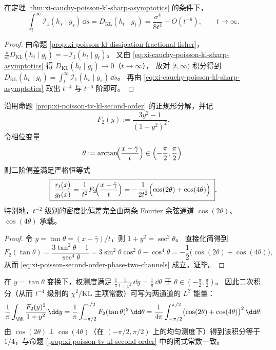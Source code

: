 \begin{corollary}\label{cor:xi-cauchy-poisson-fisher-tail-integral}
在定理 \ref{thm:xi-cauchy-poisson-kl-sharp-asymptotics} 的条件下，
\[
\int_t^\infty \mathcal I_1(h_s\mid g_s)\,\dd s
=D_{\mathrm{KL}}(h_t\mid g_t)
=\frac{\sigma^4}{8t^4}+O(t^{-6}),
\qquad t\to\infty.
\]
\end{corollary}
\begin{proof}
由命题 \ref{prop:xi-poisson-kl-dissipation-fractional-fisher}，
\(
\frac{\dd}{\dd t}D_{\mathrm{KL}}(h_t\mid g_t)=-\mathcal I_1(h_t\mid g_t)
\)。
又由 \eqref{eq:xi-cauchy-poisson-kl-sharp-asymptotics} 得 \(D_{\mathrm{KL}}(h_t\mid g_t)\to 0\)（\(t\to\infty\)），
故对 \([t,\infty)\) 积分得到
\(
D_{\mathrm{KL}}(h_t\mid g_t)=\int_t^\infty \mathcal I_1(h_s\mid g_s)\,\dd s
\)。
再由 \eqref{eq:xi-cauchy-poisson-kl-sharp-asymptotics} 取出 \(t^{-4}\) 与 \(t^{-6}\) 阶即可。
\end{proof}

\begin{proposition}\label{prop:xi-poisson-second-order-two-cosine-channels}
沿用命题 \ref{prop:xi-poisson-tv-kl-second-order} 的正规形分解，并记
\[
F_2(y):=\frac{3y^2-1}{(1+y^2)^2}.
\]
令相位变量
\[
\theta:=\arctan\!\Bigl(\frac{x-\bar\gamma}{t}\Bigr)\in\Bigl(-\frac{\pi}{2},\frac{\pi}{2}\Bigr).
\]
则二阶偏差满足严格恒等式
\begin{equation}\label{eq:xi-poisson-second-order-phase-two-channels}
\boxed{\;
\frac{r_t(x)}{g_t(x)}
=\frac{1}{t^2}F_2\!\Bigl(\frac{x-\bar\gamma}{t}\Bigr)
=-\frac{1}{2t^2}\Bigl(\cos(2\theta)+\cos(4\theta)\Bigr)\; }.
\end{equation}
特别地，\(t^{-2}\) 级别的密度比偏差完全由两条 Fourier 余弦通道 \(\cos(2\theta)\)、\(\cos(4\theta)\) 承载。
\end{proposition}

\begin{proof}
令 \(y=\tan\theta=(x-\bar\gamma)/t\)，则 \(1+y^2=\sec^2\theta\)。
直接化简得到
\[
F_2(\tan\theta)=\frac{3\tan^2\theta-1}{\sec^4\theta}
=3\sin^2\theta\cos^2\theta-\cos^4\theta
=-\frac12\bigl(\cos(2\theta)+\cos(4\theta)\bigr),
\]
从而 \eqref{eq:xi-poisson-second-order-phase-two-channels} 成立。证毕。
\end{proof}

\begin{remark}[二通道正交与二次常数的闭式读出]\label{rem:xi-poisson-second-order-orthogonal-constants}
在 \(y=\tan\theta\) 变换下，权测度满足
\(
\frac{1}{\pi}\frac{1}{1+y^2}\,\dd y=\frac{1}{\pi}\,\dd\theta
\) 于 \(\theta\in(-\tfrac{\pi}{2},\tfrac{\pi}{2})\)。
因此二次积分（从而 \(t^{-4}\) 级别的 \(\chi^2\)/KL 主项常数）可写为两通道的 \(L^2\) 能量：
\[
\frac{1}{\pi}\int_{\RR}\frac{F_2(y)^2}{1+y^2}\,\dd y
=\frac{1}{\pi}\int_{-\pi/2}^{\pi/2}F_2(\tan\theta)^2\,\dd\theta
=\frac{1}{4\pi}\int_{-\pi/2}^{\pi/2}\bigl(\cos(2\theta)+\cos(4\theta)\bigr)^2\,\dd\theta.
\]
由 \(\cos(2\theta)\perp \cos(4\theta)\)（在 \((-\pi/2,\pi/2)\) 上的均匀测度下）得到该积分等于 \(1/4\)，与命题 \ref{prop:xi-poisson-tv-kl-second-order} 中的闭式常数一致。
\end{remark}


